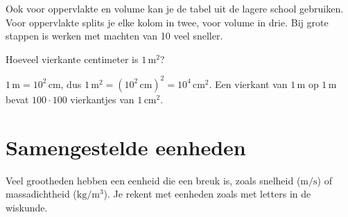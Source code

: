 \documentclass{ximera}
\begin{document}
\begin{remark}[expandable=true,title={Herhaling: de tabel voor oppervlakte en volume}]\nl
    Ook voor oppervlakte en volume kan je de tabel uit de lagere school gebruiken. Voor oppervlakte splits je elke kolom in twee, voor volume in drie. Bij grote stappen is werken met machten van 10 veel sneller.
    \begin{center}
        \hspace{1cm}
    \end{center}
\end{remark}

\begin{question}
    Hoeveel vierkante centimeter is $1 \, \mathrm{m}^{2}$?

    \begin{multipleChoice}
    \end{multipleChoice}

    \begin{solution}\nl
        $1 \, \mathrm{m} = 10^{2} \, \mathrm{cm}$, dus $1 \, \mathrm{m}^{2} = (10^{2} \, \mathrm{cm})^{2} = 10^{4} \, \mathrm{cm}^{2}$. Een vierkant van $1 \, \mathrm{m}$ op $1 \, \mathrm{m}$ bevat $100 \cdot 100$ vierkantjes van $1 \, \mathrm{cm}^{2}$.
    \end{solution}
\end{question}

\section{Samengestelde eenheden}\label{sec:samengestelde_eenheden}
Veel grootheden hebben een eenheid die een breuk is, zoals snelheid ($\mathrm{m/s}$) of massadichtheid ($\mathrm{kg/m^3}$). Je rekent met eenheden zoals met letters in de wiskunde.
\end{document}
